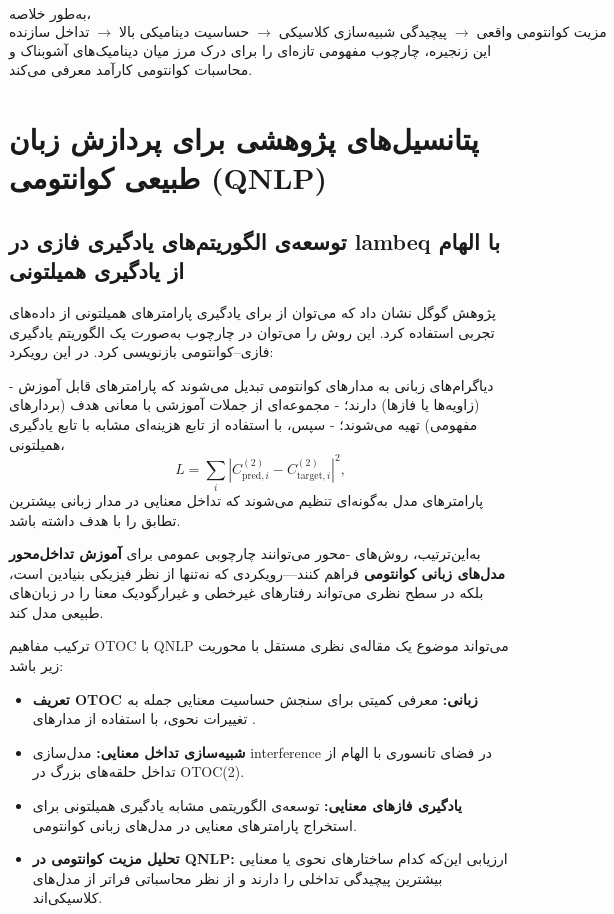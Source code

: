به‌طور خلاصه،  
\[
\text{تداخل سازنده} \;\longrightarrow\; \text{حساسیت دینامیکی بالا} \;\longrightarrow\; \text{پیچیدگی شبیه‌سازی کلاسیکی} \;\longrightarrow\; \text{مزیت کوانتومی واقعی}
\]
این زنجیره، چارچوب مفهومی تازه‌ای را برای درک مرز میان دینامیک‌های آشوبناک و محاسبات کوانتومی کارآمد معرفی می‌کند.

\section{پتانسیل‌های پژوهشی برای پردازش زبان طبیعی کوانتومی (QNLP)}
\label{sec:qnlfuture}

\subsection{توسعه‌ی الگوریتم‌های یادگیری فازی در lambeq با الهام از یادگیری همیلتونی}

پژوهش گوگل نشان داد که می‌توان از  برای یادگیری پارامترهای همیلتونی از داده‌های تجربی استفاده کرد.  
این روش را می‌توان در چارچوب  به‌صورت یک الگوریتم یادگیری فازی–کوانتومی بازنویسی کرد. در این رویکرد:

- دیاگرام‌های زبانی  به مدارهای کوانتومی تبدیل می‌شوند که پارامترهای قابل آموزش (زاویه‌ها یا فازها) دارند؛  
- مجموعه‌ای از جملات آموزشی با معانی هدف (بردارهای مفهومی) تهیه می‌شوند؛  
- سپس، با استفاده از تابع هزینه‌ای مشابه با تابع یادگیری همیلتونی،
\[
L = \sum_i \left| C^{(2)}_{\text{pred},i} - C^{(2)}_{\text{target},i} \right|^2,
\]
پارامترهای مدل به‌گونه‌ای تنظیم می‌شوند که تداخل معنایی در مدار زبانی بیشترین تطابق را با هدف داشته باشد.

به‌این‌ترتیب، روش‌های -محور می‌توانند چارچوبی عمومی برای \textbf{آموزش تداخل‌محور مدل‌های زبانی کوانتومی} فراهم کنند—رویکردی که نه‌تنها از نظر فیزیکی بنیادین است، بلکه در سطح نظری می‌تواند رفتارهای غیرخطی و غیرارگودیک معنا را در زبان‌های طبیعی مدل کند.

ترکیب مفاهیم OTOC با QNLP می‌تواند موضوع یک مقاله‌ی نظری مستقل با محوریت زیر باشد:
\begin{itemize}
	\item \textbf{تعریف OTOC زبانی:} معرفی کمیتی برای سنجش حساسیت معنایی جمله به تغییرات نحوی، با استفاده از مدارهای .
	\item \textbf{شبیه‌سازی تداخل معنایی:} مدل‌سازی interference در فضای تانسوری با الهام از تداخل حلقه‌های بزرگ در OTOC(2).
	\item \textbf{یادگیری فازهای معنایی:} توسعه‌ی الگوریتمی مشابه یادگیری همیلتونی برای استخراج پارامترهای معنایی در مدل‌های زبانی کوانتومی.
	\item \textbf{تحلیل مزیت کوانتومی در QNLP:} ارزیابی این‌که کدام ساختارهای نحوی یا معنایی بیشترین پیچیدگی تداخلی را دارند و از نظر محاسباتی فراتر از مدل‌های کلاسیکی‌اند.
\end{itemize}

